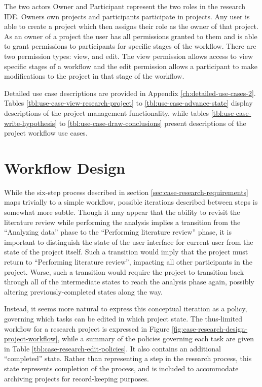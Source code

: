 \documentclass[document.tex]{subfiles}
\begin{document}
\FloatBarrier

The two actors Owner and Participant represent the two roles in the research IDE. Owners own projects and participants participate in projects. Any user is able to create a project which then assigns their role as the owner of that project. As an owner of a project the user has all permissions granted to them and is able to grant permissions to participants for specific stages of the workflow. There are two permission types: view, and edit. The view permission allows access to view specific stages of a workflow and the edit permission allows a participant to make modifications to the project in that stage of the workflow.

Detailed use case descriptions are provided in Appendix \ref{ch:detailed-use-cases-2}. Tables \ref{tbl:use-case-view-research-project} to \ref{tbl:use-case-advance-state} display descriptions of the project management functionality, while tables \ref{tbl:use-case-write-hypothesis} to \ref{tbl:use-case-draw-conclusions} present descriptions of the project workflow use cases.

\FloatBarrier

\section {Workflow Design}
\label{sec:case-research-workflow-design}

While the six-step process described in section \ref{sec:case-research-requirements} maps trivially to a simple workflow, possible iterations described between steps is somewhat more subtle. Though it may appear that the ability to revisit the literature review while performing the analysis implies a transition from the ``Analyzing data'' phase to the ``Performing literature review'' phase, it is important to distinguish the state of the user interface for current user from the state of the project itself. Such a transition would imply that the project must return to ``Performing literature review'', impacting all other participants in the project. Worse, such a transition would require the project to transition back through all of the intermediate states to reach the analysis phase again, possibly altering previously-completed states along the way.

Instead, it seems more natural to express this conceptual iteration as a policy, governing which tasks can be edited in which project state. The thus-limited workflow for a research project is expressed in Figure \ref{fig:case-research-design-project-workflow}, while a summary of the policies governing each task are given in Table \ref{tbl:case-research-edit-policies}. It also contains an additional ``completed'' state. Rather than representing a step in the research process, this state represents completion of the process, and is included to accommodate archiving projects for record-keeping purposes.
\end{document}
